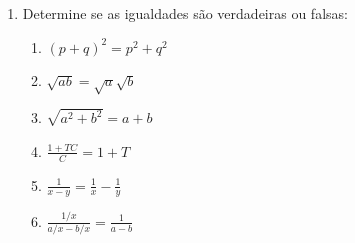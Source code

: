 \documentclass[a4paper,5pt]{amsbook}
\newcommand{\ds}{\displaystyle}
\begin{document}
\begin{enumerate}
        \noindent{}

    \vspace{0.5cm}
    \item Determine se as igualdades s\~ao verdadeiras ou falsas:
        \begin{enumerate}
            \vspace{0.3cm}
            \item ${(p+q)}^2=p^2+q^2$
            \vspace{0.3cm}
            \item $\sqrt{ab}=\sqrt{a}\sqrt{b}$
            \vspace{0.3cm}
            \item $\sqrt{a^2+b^2}=a+b$
            \vspace{0.3cm}
            \item $\ds\frac{1+TC}{C}=1+T$
            \vspace{0.3cm}
            \item $\ds\frac{1}{x-y}=\frac{1}{x}-\frac{1}{y}$
            \vspace{0.3cm}
            \item $\ds\frac{1/x}{a/x-b/x}=\frac{1}{a-b}$
        \end{enumerate}
\end{enumerate}
\end{document}
